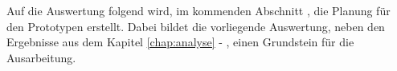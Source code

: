 \documentclass[Bachelorarbeit.tex]{subfiles}
\begin{document}
Auf die Auswertung folgend wird, im kommenden Abschnitt , die Planung für den Prototypen erstellt.
Dabei bildet die vorliegende Auswertung, neben den Ergebnisse aus dem Kapitel \ref{chap:analyse} - , einen Grundstein für die Ausarbeitung.

\newpage

\end{document}

